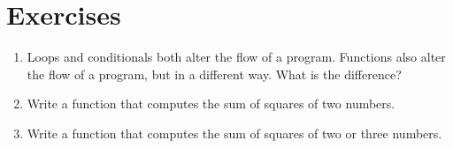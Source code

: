 \section{Exercises}
\begin{enumerate}
	\item Loops and conditionals both alter the flow of a program. Functions also alter the flow of a program, but in a different way. What is the difference?
% 
% 
% 
% 
% 
% 
% 
% 
% 
% 
% 
% 

	\item Write a function that computes the sum of squares of two    numbers.
	\item Write a function that computes the sum of squares of two or    three numbers.




\end{enumerate}
